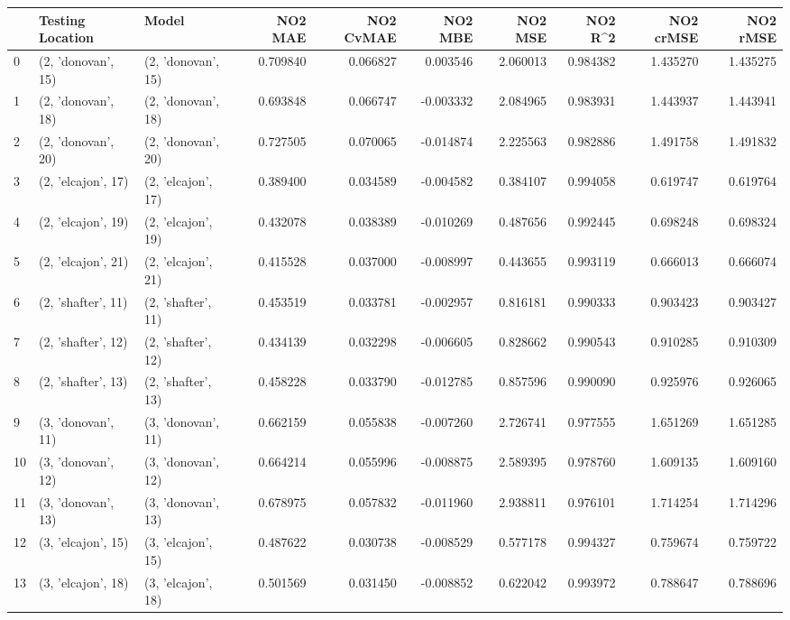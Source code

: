 \begin{tabular}{lllrrrrrrr}
\toprule
{} &    Testing Location &               Model &   NO2 MAE &  NO2 CvMAE &   NO2 MBE &   NO2 MSE &   NO2 R\textasciicircum2 &  NO2 crMSE &  NO2 rMSE \\
\midrule
0  &  (2, 'donovan', 15) &  (2, 'donovan', 15) &  0.709840 &   0.066827 &  0.003546 &  2.060013 &  0.984382 &   1.435270 &  1.435275 \\
1  &  (2, 'donovan', 18) &  (2, 'donovan', 18) &  0.693848 &   0.066747 & -0.003332 &  2.084965 &  0.983931 &   1.443937 &  1.443941 \\
2  &  (2, 'donovan', 20) &  (2, 'donovan', 20) &  0.727505 &   0.070065 & -0.014874 &  2.225563 &  0.982886 &   1.491758 &  1.491832 \\
3  &  (2, 'elcajon', 17) &  (2, 'elcajon', 17) &  0.389400 &   0.034589 & -0.004582 &  0.384107 &  0.994058 &   0.619747 &  0.619764 \\
4  &  (2, 'elcajon', 19) &  (2, 'elcajon', 19) &  0.432078 &   0.038389 & -0.010269 &  0.487656 &  0.992445 &   0.698248 &  0.698324 \\
5  &  (2, 'elcajon', 21) &  (2, 'elcajon', 21) &  0.415528 &   0.037000 & -0.008997 &  0.443655 &  0.993119 &   0.666013 &  0.666074 \\
6  &  (2, 'shafter', 11) &  (2, 'shafter', 11) &  0.453519 &   0.033781 & -0.002957 &  0.816181 &  0.990333 &   0.903423 &  0.903427 \\
7  &  (2, 'shafter', 12) &  (2, 'shafter', 12) &  0.434139 &   0.032298 & -0.006605 &  0.828662 &  0.990543 &   0.910285 &  0.910309 \\
8  &  (2, 'shafter', 13) &  (2, 'shafter', 13) &  0.458228 &   0.033790 & -0.012785 &  0.857596 &  0.990090 &   0.925976 &  0.926065 \\
9  &  (3, 'donovan', 11) &  (3, 'donovan', 11) &  0.662159 &   0.055838 & -0.007260 &  2.726741 &  0.977555 &   1.651269 &  1.651285 \\
10 &  (3, 'donovan', 12) &  (3, 'donovan', 12) &  0.664214 &   0.055996 & -0.008875 &  2.589395 &  0.978760 &   1.609135 &  1.609160 \\
11 &  (3, 'donovan', 13) &  (3, 'donovan', 13) &  0.678975 &   0.057832 & -0.011960 &  2.938811 &  0.976101 &   1.714254 &  1.714296 \\
12 &  (3, 'elcajon', 15) &  (3, 'elcajon', 15) &  0.487622 &   0.030738 & -0.008529 &  0.577178 &  0.994327 &   0.759674 &  0.759722 \\
13 &  (3, 'elcajon', 18) &  (3, 'elcajon', 18) &  0.501569 &   0.031450 & -0.008852 &  0.622042 &  0.993972 &   0.788647 &  0.788696 \\

\end{tabular}
